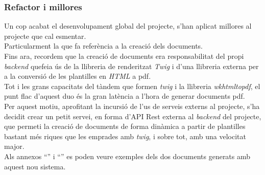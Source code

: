 \subsubsection{Refactor i millores}
Un cop acabat el desenvolupament global del projecte, s'han aplicat millores al projecte que cal esmentar.\\
Particularment la que fa referència a la creació dels documents.\\
\newline Fins ara, recordem que la creació de documents era responsabilitat del propi \textit{backend} quefeia ús de la llibreria de renderitzat \textit{Twig} i d'una llibreria externa per a la conversió de les plantilles en \textit{HTML} a pdf.\\
\newline Tot i les grans capacitats del tàndem que formen \textit{twig} i la llibreria \textit{wkhtmltopdf}, el punt flac d'aquest duo és la gran latència a l'hora de generar documents pdf.\\
\newline Per aquest motiu, aprofitant la incursió de l'us de serveis externs al projecte, s'ha decidit crear un petit servei,  en forma d'API Rest externa al \textit{backend} del projecte, que permeti la creació de documents de forma dinàmica a partir de plantilles bastant més riques que les emprades amb \textit{twig}, i sobre tot, amb una velocitat major.\\
\newline Als annexos ``'' i ``'' es poden veure exemples dels dos documents generats amb aquest nou sistema.
    

